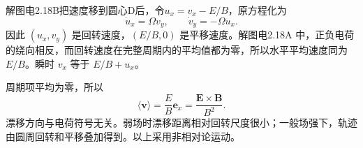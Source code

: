 \documentclass[UTF8,fontset=fandol,a4paper,11pt]{ctexart}
\newcommand{\vect}[1]{\bm{#1}}
\newcommand{\result}[1]{\begin{equation*}\boxed{#1}\end{equation*}}
\begin{document}
解图电2.18B把速度移到圆心D后，令$u_x=v_x-E/B$，原方程化为
\[
\dot u_x=\Omega v_y,\qquad \dot v_y=-\Omega u_x.
\]
因此 $(u_x,v_y)$ 是回转速度，$(E/B,0)$ 是平移速度。解图电2.18A 中，正负电荷的绕向相反，而回转速度在完整周期内的平均值都为零，所以水平平均速度同为 $E/B$。瞬时 $v_x$ 等于 $E/B+u_x$。

周期项平均为零，所以
\result{\langle\vect v\rangle=\frac EB\vect e_x
 =\frac{\vect E\times\vect B}{B^2}.}
漂移方向与电荷符号无关。弱场时漂移距离相对回转尺度很小；一般场强下，轨迹由圆周回转和平移叠加得到。以上采用非相对论运动。

\begin{center}\begin{minipage}{.97\linewidth}\centering
{}
\end{minipage}
\end{center}
\end{document}
